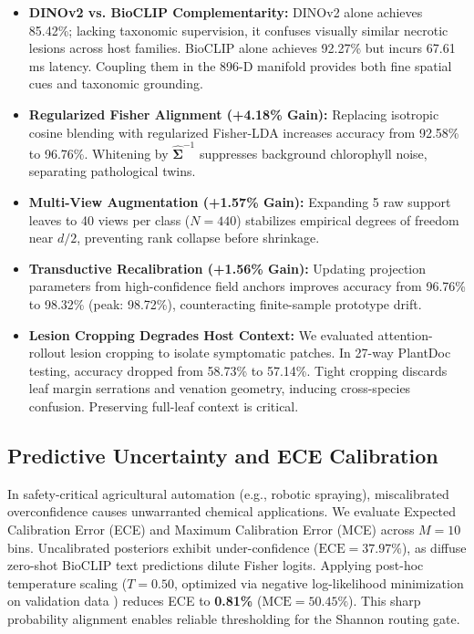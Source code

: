\documentclass[a4paper,fleqn,nologo]{cas-dc}
\begin{document}
\begin{itemize}
    \item \textbf{DINOv2 vs. BioCLIP Complementarity:} DINOv2 alone achieves 85.42\%; lacking taxonomic supervision, it confuses visually similar necrotic lesions across host families. BioCLIP alone achieves 92.27\% but incurs 67.61\,ms latency. Coupling them in the 896-D manifold provides both fine spatial cues and taxonomic grounding.
    \item \textbf{Regularized Fisher Alignment (+4.18\% Gain):} Replacing isotropic cosine blending with regularized Fisher-LDA increases accuracy from 92.58\% to 96.76\%. Whitening by $\hat{\mathbf{\Sigma}}^{-1}$ suppresses background chlorophyll noise, separating pathological twins.
    \item \textbf{Multi-View Augmentation (+1.57\% Gain):} Expanding 5 raw support leaves to 40 views per class ($N=440$) stabilizes empirical degrees of freedom near $d/2$, preventing rank collapse before shrinkage.
    \item \textbf{Transductive Recalibration (+1.56\% Gain):} Updating projection parameters from high-confidence field anchors improves accuracy from 96.76\% to 98.32\% (peak: 98.72\%), counteracting finite-sample prototype drift.
    \item \textbf{Lesion Cropping Degrades Host Context:} We evaluated attention-rollout lesion cropping to isolate symptomatic patches. In 27-way PlantDoc testing, accuracy dropped from 58.73\% to 57.14\%. Tight cropping discards leaf margin serrations and venation geometry, inducing cross-species confusion. Preserving full-leaf context is critical.
\end{itemize}

\subsection{Predictive Uncertainty and ECE Calibration}
\label{sec:calibration}
In safety-critical agricultural automation (e.g., robotic spraying), miscalibrated overconfidence causes unwarranted chemical applications. We evaluate Expected Calibration Error (ECE) and Maximum Calibration Error (MCE) across $M=10$ bins. Uncalibrated posteriors exhibit under-confidence ($\text{ECE} = 37.97\%$), as diffuse zero-shot BioCLIP text predictions dilute Fisher logits. Applying post-hoc temperature scaling ($T=0.50$, optimized via negative log-likelihood minimization on validation data \cite{guo2017calibration}) reduces ECE to \textbf{0.81\%} ($\text{MCE} = 50.45\%$). This sharp probability alignment enables reliable thresholding for the Shannon routing gate.
\end{document}
